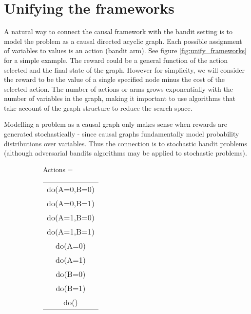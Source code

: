\documentclass[11pt,a4paper]{article}
\begin{document}
\section{Unifying the frameworks}

A natural way to connect the causal framework with the bandit setting is to model the problem as a causal directed acyclic graph. Each possible assignment of variables to values is an action (bandit arm). See figure \ref{fig:unify_frameworks} for a simple example. The reward could be a general function of the action selected and the final state of the graph. However for simplicity, we will consider the reward to be the value of a single specified node minus the cost of the selected action. The number of actions or arms grows exponentially with the number of variables in the graph, making it important to use algorithms that take account of the graph structure to reduce the search space. 

Modelling a problem as a causal graph only makes sense when rewards are generated stochastically - since causal graphs fundamentally model probability distributions over variables. Thus the connection is to stochastic bandit problems (although adversarial bandits algorithms may be applied to stochastic problems). 


\begin{figure}[h]
\caption{A simple causal graphical model and corresponding complete action space. A and B represent binary variables that can be intervened on and Y represents the reward.}
\label{fig:unify_frameworks}
\centering
\begin{subfigure}[c]{0.3\textwidth}
\end{subfigure}
\begin{subfigure}[t]{0.4\textwidth}
Actions = \begin{tabular}{|c|}
	\hline
  do(A=0,B=0) \\
  do(A=0,B=1) \\
  do(A=1,B=0) \\
  do(A=1,B=1) \\
  \hline
  do(A=0) \\
  do(A=1) \\
  do(B=0) \\
  do(B=1) \\
  do() \\
  \hline
\end{tabular}
\end{subfigure}
\end{figure}
\end{document}
